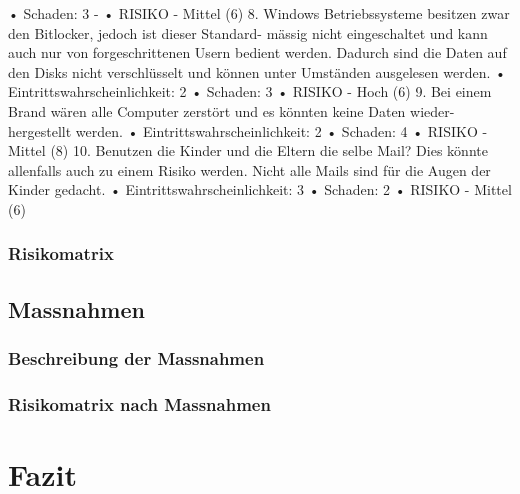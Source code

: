 \documentclass{article}
\begin{document}
• Schaden: 3 -
• RISIKO - Mittel (6)
8. Windows Betriebssysteme besitzen zwar den Bitlocker, jedoch ist dieser Standard-
mässig nicht eingeschaltet und kann auch nur von forgeschrittenen Usern bedient
werden. Dadurch sind die Daten auf den Disks nicht verschlüsselt und können unter
Umständen ausgelesen werden.
• Eintrittswahrscheinlichkeit: 2
• Schaden: 3
• RISIKO - Hoch (6)
9. Bei einem Brand wären alle Computer zerstört und es könnten keine Daten wieder-
hergestellt werden.
• Eintrittswahrscheinlichkeit: 2
• Schaden: 4
• RISIKO - Mittel (8)
10. Benutzen die Kinder und die Eltern die selbe Mail? Dies könnte allenfalls auch zu
einem Risiko werden. Nicht alle Mails sind für die Augen der Kinder gedacht.
• Eintrittswahrscheinlichkeit: 3
• Schaden: 2
• RISIKO - Mittel (6)


\subsubsection{Risikomatrix}


\subsection{Massnahmen}

\subsubsection{Beschreibung der Massnahmen}

\subsubsection{Risikomatrix nach Massnahmen}



\section{Fazit}
\end{document}
